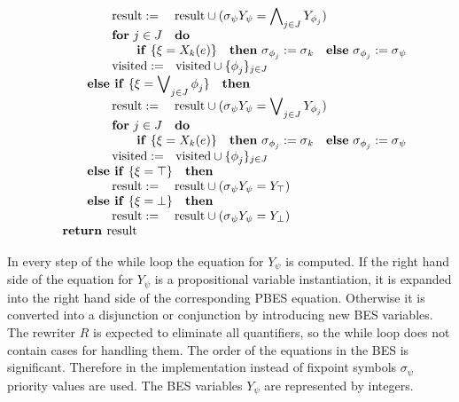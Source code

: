 \documentclass{article}
\begin{document}
{\begin{equation*}
\begin{array}{l}
\qquad \qquad \text{result}:=\text{ result}\cup (\sigma _{\psi }Y_{\psi
}=\dbigwedge_{j\in J}Y_{\phi _{j}}) \\ 
\qquad \qquad \text{\textbf{for} }j\in J\text{ \textbf{do}} \\ 
\qquad \qquad \qquad \text{\textbf{if} }\{\xi =X_{k}(e)\}\text{ \textbf{then}
}\sigma _{\phi _{j}}:=\sigma _{k}\text{ \textbf{else} }\sigma _{\phi
_{j}}:=\sigma _{\psi } \\ 
\qquad \qquad \text{visited}:=\text{visited}\cup \{\phi _{j}\}_{j\in J} \\ 
\qquad \text{\textbf{else if} }\{\xi =\dbigvee_{j\in J}\phi _{j}\}\text{ 
\textbf{then}} \\ 
\qquad \qquad \text{result}:=\text{ result}\cup (\sigma _{\psi }Y_{\psi
}=\dbigvee_{j\in J}Y_{\phi _{j}}) \\ 
\qquad \qquad \text{\textbf{for} }j\in J\text{ \textbf{do}} \\ 
\qquad \qquad \qquad \text{\textbf{if} }\{\xi =X_{k}(e)\}\text{ \textbf{then}
}\sigma _{\phi _{j}}:=\sigma _{k}\text{ \textbf{else} }\sigma _{\phi
_{j}}:=\sigma _{\psi } \\ 
\qquad \qquad \text{visited}:=\text{visited}\cup \{\phi _{j}\}_{j\in J} \\ 
\qquad \text{\textbf{else if} }\{\xi =\top \}\text{ \textbf{then}} \\ 
\qquad \qquad \text{result}:=\text{ result}\cup (\sigma _{\psi }Y_{\psi
}=Y_{\top }) \\ 
\qquad \text{\textbf{else if} }\{\xi =\bot \}\text{ \textbf{then}} \\ 
\qquad \qquad \text{result}:=\text{ result}\cup (\sigma _{\psi }Y_{\psi
}=Y_{\bot }) \\ 
\text{\textbf{return }result}%
\end{array}%
\end{equation*}%
}

In every step of the while loop the equation for $Y_{\psi }$ is computed. If
the right hand side of the equation for $Y_{\psi }$ is a propositional
variable instantiation, it is expanded into the right hand side of the
corresponding PBES equation. Otherwise it is converted into a disjunction or
conjunction by introducing new BES variables. The rewriter $R$ is expected
to eliminate all quantifiers, so the while loop does not contain cases for
handling them. The order of the equations in the BES is significant.
Therefore in the implementation instead of fixpoint symbols $\sigma _{\psi }$
priority values are used. The BES variables $Y_{\psi }$ are represented by
integers.
\end{document}
